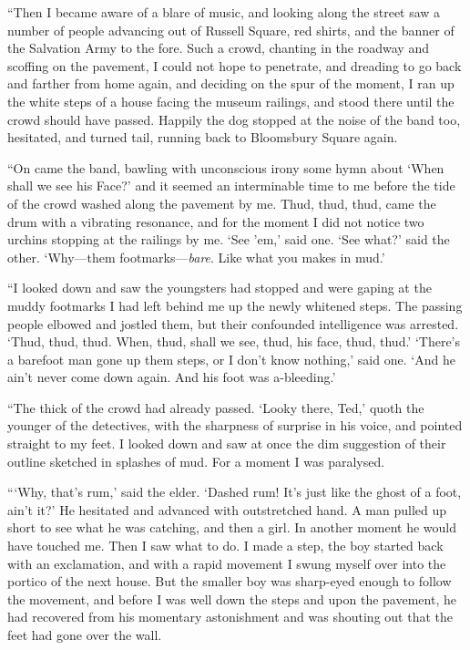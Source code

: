 “Then I became aware of a blare of music, and looking along the street saw a number of people advancing out of Russell Square, red shirts, and the banner of the Salvation Army to the fore. Such a crowd, chanting in the roadway and scoffing on the pavement, I could not hope to penetrate, and dreading to go back and farther from home again, and deciding on the spur of the moment, I ran up the white steps of a house facing the museum railings, and stood there until the crowd should have passed. Happily the dog stopped at the noise of the band too, hesitated, and turned tail, running back to Bloomsbury Square again.

“On came the band, bawling with unconscious irony some hymn about ‘When shall we see his Face?’ and it seemed an interminable time to me before the tide of the crowd washed along the pavement by me. Thud, thud, thud, came the drum with a vibrating resonance, and for the moment I did not notice two urchins stopping at the railings by me. ‘See ’em,’ said one. ‘See what?’ said the other. ‘Why—them footmarks—\emph{bare}. Like what you makes in mud.’

“I looked down and saw the youngsters had stopped and were gaping at the muddy footmarks I had left behind me up the newly whitened steps. The passing people elbowed and jostled them, but their confounded intelligence was arrested. ‘Thud, thud, thud. When, thud, shall we see, thud, his face, thud, thud.’ ‘There’s a barefoot man gone up them steps, or I don’t know nothing,’ said one. ‘And he ain’t never come down again. And his foot was a-bleeding.’

“The thick of the crowd had already passed. ‘Looky there, Ted,’ quoth the younger of the detectives, with the sharpness of surprise in his voice, and pointed straight to my feet. I looked down and saw at once the dim suggestion of their outline sketched in splashes of mud. For a moment I was paralysed.

“\kern1pt‘Why, that’s rum,’ said the elder. ‘Dashed rum! It’s just like the ghost of a foot, ain’t it?’ He hesitated and advanced with outstretched hand. A man pulled up short to see what he was catching, and then a girl. In another moment he would have touched me. Then I saw what to do. I made a step, the boy started back with an exclamation, and with a rapid movement I swung myself over into the portico of the next house. But the smaller boy was sharp-eyed enough to follow the movement, and before I was well down the steps and upon the pavement, he had recovered from his momentary astonishment and was shouting out that the feet had gone over the wall.

